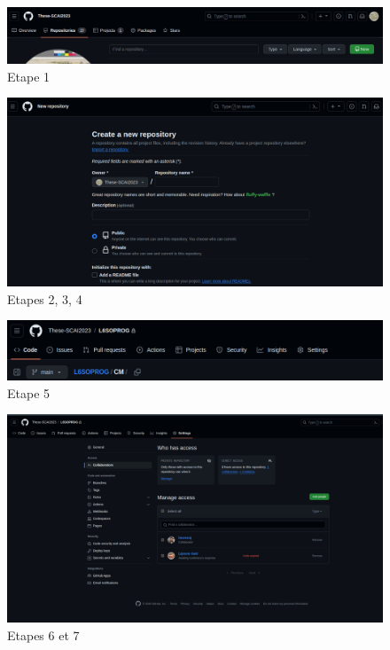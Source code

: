 \begin{figure}[H]
\caption{Etape 1}
  \includegraphics[width=12cm]{images/depot_distant_crea.png}
\end{figure}


\begin{figure}[H]
\caption{Etapes 2, 3, 4}
  \includegraphics[width=12cm]{images/depot_distant_crea2.png}
\end{figure}

\begin{figure}[H]
\caption{Etape 5}
	\includegraphics[width=12cm]{images/settings.png}
\end{figure}

\begin{figure}[H]
\caption{Etapes 6 et 7}
  \includegraphics[width=12cm]{images/collaborators}
\end{figure}


